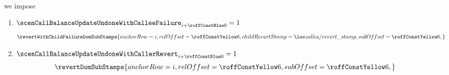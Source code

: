 \item[\underline{Setting the \texttt{dom/sub} stamps on the \callerName{} account-row $n^°(i + \callSecondCallerAccountRowOffset)$:}]
	we impose
	\begin{enumerate}
		\item \If $\scenCallBalanceUpdateUndoneWithCalleeFailure _{i + \callFirstScenarioRowOffset} = 1$ \Then
			\[
				\revertWithChildFailureDomSubStamps {
					anchorRow        = i                                 ,
					relOffset        = \callSecondCallerAccountRowOffset ,
					childRevertStamp = \locCalleeRevertStamp             ,
					subOffset        = \callSecondCallerAccountRowOffset ,
				}
			\]
		\item \If $\scenCallBalanceUpdateUndoneWithCallerRevert _{i + \callFirstScenarioRowOffset} = 1$ \Then
			\[
				\revertDomSubStamps {
					anchorRow = i                                 ,
					relOffset = \callSecondCallerAccountRowOffset ,
					subOffset = \callSecondCallerAccountRowOffset ,
				}
			\]
	\end{enumerate}
